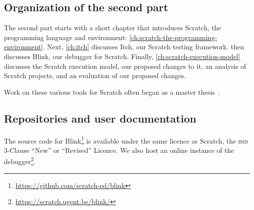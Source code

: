 \documentclass[../main]{subfiles}
\begin{document}
\subsection{Organization of the second part}\label{subsec:organization-of-the-second-part}

The second part starts with a short chapter that introduces Scratch, the programming language and environment: \cref{ch:scratch-the-programming-environment}.
Next, \cref{ch:itch} discusses Itch, our Scratch testing framework.
 then discusses Blink, our debugger for Scratch.
Finally, \cref{ch:scratch-execution-model} discusses the Scratch execution model, our proposed changes to it, an analysis of Scratch projects, and an evaluation of our proposed changes.

Work on these various tools for Scratch often began as a master thesis~\autocite{makItchEenEducatief2019,voetenEenBlokgebaseerdTestframework2023,goethalsEenTimeTravelling2023,deproftBlinkEenEducatieve2022}.

\subsection{Repositories and user documentation}\label{subsec:repositories-and-code-scratch}

The source code for Blink\footnote{\url{https://github.com/scratch-ed/blink}} is available under the same licence as Scratch, the \textsc{bsd} 3-Clause ``New'' or ``Revised'' Licence.
We also host an online instance of the debugger\footnote{\url{https://scratch.ugent.be/blink/}}.
\end{document}
